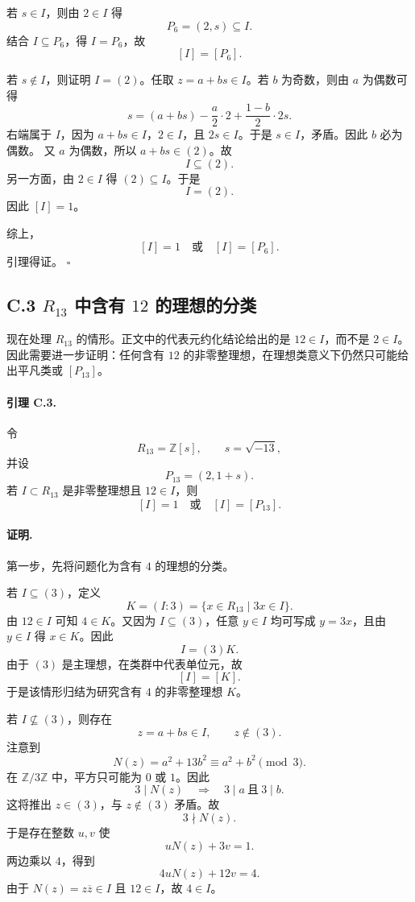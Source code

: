 若 \(s\in I\)，则由 \(2\in I\) 得
\[
P_6=(2,s)\subseteq I.
\]
结合 \(I\subseteq P_6\)，得 \(I=P_6\)，故
\[
[I]=[P_6].
\]

若 \(s\notin I\)，则证明 \(I=(2)\)。任取
\(z=a+bs\in I\)。若 \(b\) 为奇数，则由 \(a\) 为偶数可得
\[
s
=
(a+bs)-\frac a2\cdot2+\frac{1-b}{2}\cdot2s.
\]
右端属于 \(I\)，因为 \(a+bs\in I\)，\(2\in I\)，且
\(2s\in I\)。于是 \(s\in I\)，矛盾。因此 \(b\) 必为偶数。
又 \(a\) 为偶数，所以 \(a+bs\in(2)\)。故
\[
I\subseteq(2).
\]
另一方面，由 \(2\in I\) 得 \((2)\subseteq I\)。于是
\[
I=(2).
\]
因此 \([I]=1\)。

综上，
\[
[I]=1\quad\text{或}\quad [I]=[P_6].
\]
引理得证。 \(\square\)

\subsection*{C.3 \(R_{13}\) 中含有 \(12\) 的理想的分类}

现在处理 \(R_{13}\) 的情形。正文中的代表元约化结论给出的是
\(12\in I\)，而不是 \(2\in I\)。因此需要进一步证明：任何含有
\(12\) 的非零整理想，在理想类意义下仍然只可能给出平凡类或
\([P_{13}]\)。

\paragraph{引理 C.3.}
令
\[
R_{13}=\mathbb Z[s],\qquad s=\sqrt{-13},
\]
并设
\[
P_{13}=(2,1+s).
\]
若 \(I\subset R_{13}\) 是非零整理想且 \(12\in I\)，则
\[
[I]=1\quad\text{或}\quad [I]=[P_{13}].
\]

\paragraph{证明.}
第一步，先将问题化为含有 \(4\) 的理想的分类。

若 \(I\subseteq(3)\)，定义
\[
K=(I:3)=\{x\in R_{13}\mid 3x\in I\}.
\]
由 \(12\in I\) 可知 \(4\in K\)。又因为 \(I\subseteq(3)\)，任意
\(y\in I\) 均可写成 \(y=3x\)，且由 \(y\in I\) 得 \(x\in K\)。因此
\[
I=(3)K.
\]
由于 \((3)\) 是主理想，在类群中代表单位元，故
\[
[I]=[K].
\]
于是该情形归结为研究含有 \(4\) 的非零整理想 \(K\)。

若 \(I\not\subseteq(3)\)，则存在
\[
z=a+bs\in I,
\qquad
z\notin(3).
\]
注意到
\[
N(z)=a^2+13b^2\equiv a^2+b^2\pmod3.
\]
在 \(\mathbb Z/3\mathbb Z\) 中，平方只可能为 \(0\) 或 \(1\)。因此
\[
3\mid N(z)
\quad\Longrightarrow\quad
3\mid a\ \text{且}\ 3\mid b.
\]
这将推出 \(z\in(3)\)，与 \(z\notin(3)\) 矛盾。故
\[
3\nmid N(z).
\]
于是存在整数 \(u,v\) 使
\[
uN(z)+3v=1.
\]
两边乘以 \(4\)，得到
\[
4uN(z)+12v=4.
\]
由于 \(N(z)=z\overline z\in I\) 且 \(12\in I\)，故 \(4\in I\)。

